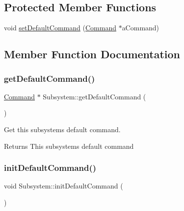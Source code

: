 \subsection*{Protected Member Functions}
\begin{DoxyCompactItemize}
\item 
void \mbox{\hyperlink{classlib_iterative_robot_1_1_subsystem_a6fff5c5756245ac750c2b26ee0ed2be7}{set\+Default\+Command}} (\mbox{\hyperlink{classlib_iterative_robot_1_1_command}{Command}} $\ast$a\+Command)
\end{DoxyCompactItemize}


\subsection{Member Function Documentation}
\mbox{\label{classlib_iterative_robot_1_1_subsystem_a7e0c4904d9ff8ad2e4b6bc98d0f9579f}} 
\subsubsection{\texorpdfstring{getDefaultCommand()}{getDefaultCommand()}}
{\footnotesize\ttfamily \mbox{\hyperlink{classlib_iterative_robot_1_1_command}{Command}} $\ast$ Subsystem\+::get\+Default\+Command (\begin{DoxyParamCaption}{ }\end{DoxyParamCaption})}

Get this subsystem\textquotesingle{}s default command.

\begin{DoxyReturn}{Returns}
This subsystem\textquotesingle{}s default command 
\end{DoxyReturn}
\mbox{\label{classlib_iterative_robot_1_1_subsystem_a30bd6c33c84c896f31ed01c8331aab57}} 
\subsubsection{\texorpdfstring{initDefaultCommand()}{initDefaultCommand()}}
{\footnotesize\ttfamily void Subsystem\+::init\+Default\+Command (\begin{DoxyParamCaption}{ }\end{DoxyParamCaption})\hspace{0.3cm}{\ttfamily [virtual]}}

